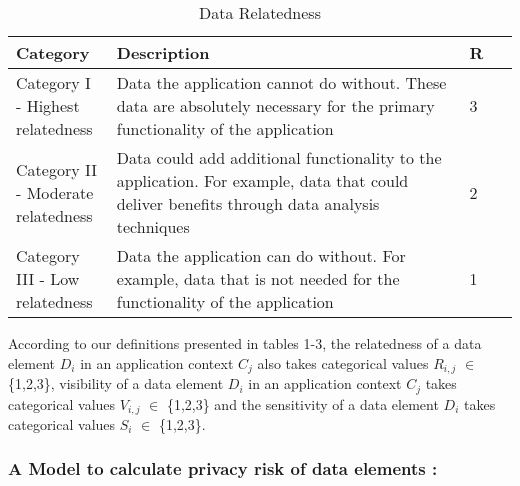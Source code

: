 \documentclass[10pt]{article}
\begin{document}
\begin{center}
\begin{table}[htbp]
\caption{Data Relatedness}
\begin{center}
\begin{adjustbox}{width=0.5\textwidth} 
\begin{tabular}{|p{0.2\linewidth}|p{0.7\linewidth}|p{0.1\linewidth}|} 
\hline
Category & Description & R \\
\hline
Category I - Highest relatedness & Data the application cannot do without. These data are absolutely necessary for the primary functionality of the application & 3 \\
\hline
Category II - Moderate relatedness & Data could add additional functionality to the application. For example, data that could deliver benefits through data analysis techniques & 2 \\
\hline
Category III - Low relatedness & Data the application can do without. For example, data that is not needed for the functionality of the application & 1 \\
\hline
\end{tabular}
\end{adjustbox}
\end{center}
\end{table}
\end{center} 
According to our definitions presented in tables 1-3, the relatedness of a data element \textit {$D_i$} in an application context \textit {$C_j$} also takes categorical values \textit {$R_{i,j}$} $\in$ \{1,2,3\}, visibility of a data element \textit {$D_i$} in an application context \textit {$C_j$} takes categorical values \textit {$V_{i,j}$} $\in$ \{1,2,3\} and the sensitivity of a data element \textit {$D_i$} takes categorical values \textit {$S_i$} $\in$ \{1,2,3\}.

\subsubsection{ A Model to calculate privacy risk of data elements : }
\end{document}
